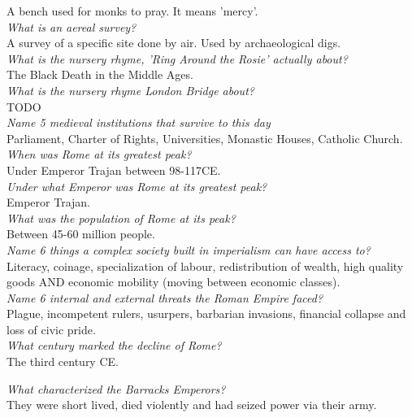 \documentclass[12pt]{article}
\begin{document}
A bench used for monks to pray. It means 'mercy'.\\

\textit{What is an aereal survey?}\\
A survey of a specific site done by air. Used by archaeological digs.\\

\textit{What is the nursery rhyme, 'Ring Around the Rosie' actually about?}\\
The Black Death in the Middle Ages.\\

\textit{What is the nursery rhyme London Bridge about?}\\
TODO\\

\textit{Name 5 medieval institutions that survive to this day}\\
Parliament, Charter of Rights, Universities, Monastic Houses, Catholic Church.\\

\textit{When was Rome at its greatest peak?}\\
Under Emperor Trajan between 98-117CE.\\
 
\textit{Under what Emperor was Rome at its greatest peak?}\\
Emperor Trajan.\\

\textit{What was the population of Rome at its peak?}\\
Between 45-60 million people.\\

\textit{Name 6 things a complex society built in imperialism can have access to?}\\
Literacy, coinage, specialization of labour, redistribution of wealth, high quality goods AND economic mobility (moving between economic classes).\\

\textit{Name 6 internal and external threats the Roman Empire faced?}\\
Plague, incompetent rulers, usurpers, barbarian invasions, financial collapse and loss of civic pride.\\

\textit{What century marked the decline of Rome?}\\
The third century CE.

\textit{What characterized the Barracks Emperors?}\\
They were short lived, died violently and had seized power via their army.\\
\end{document}
